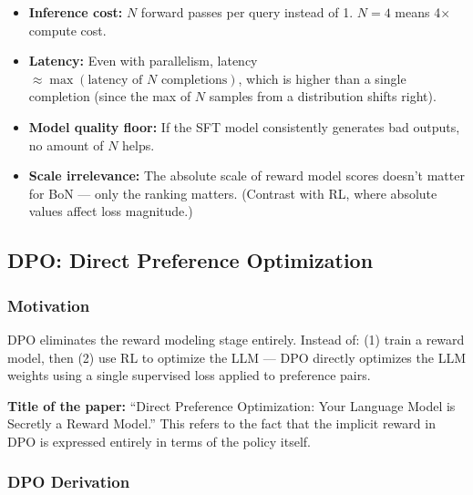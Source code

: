 \documentclass[11pt, a4paper]{article}
\begin{document}
\begin{warnbox}
\begin{itemize}[leftmargin=1.5em]
  \item \textbf{Inference cost:} $N$ forward passes per query instead of 1. $N=4$ means 4$\times$ compute cost.
  \item \textbf{Latency:} Even with parallelism, latency $\approx \max(\text{latency of }N\text{ completions})$, which is higher than a single completion (since the max of $N$ samples from a distribution shifts right).
  \item \textbf{Model quality floor:} If the SFT model consistently generates bad outputs, no amount of $N$ helps.
  \item \textbf{Scale irrelevance:} The absolute scale of reward model scores doesn't matter for BoN --- only the ranking matters. (Contrast with RL, where absolute values affect loss magnitude.)
\end{itemize}
\end{warnbox}

\subsection{DPO: Direct Preference Optimization}

\subsubsection{Motivation}

\begin{defbox}
DPO eliminates the reward modeling stage entirely. Instead of: (1) train a reward model, then (2) use RL to optimize the LLM --- DPO directly optimizes the LLM weights using a single supervised loss applied to preference pairs.

\textbf{Title of the paper:} ``Direct Preference Optimization: Your Language Model is Secretly a Reward Model.'' This refers to the fact that the implicit reward in DPO is expressed entirely in terms of the policy itself.
\end{defbox}

\subsubsection{DPO Derivation}
\end{document}
